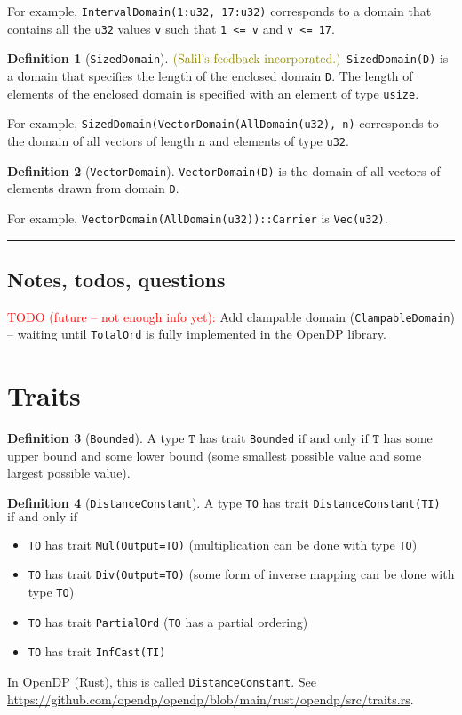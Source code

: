 \documentclass[11pt,a4paper]{article}
\theoremstyle{definition}
\newtheorem{definition}{Definition}[section]
\newcommand{\horizline}{\noindent\rule{\textwidth}{1pt}}
\newcommand{\sfi}{\text{\textcolor{olive}{(Salil's feedback incorporated.)}}}
\newcommand{\inOpenDPRust}[2]{In OpenDP (Rust), this is called \texttt{#1}. See \url{#2}.}
\newcommand{\T}{\texttt{T}}
\newcommand{\todonei}{{\textcolor{red}{TODO (future -- not enough info yet): }}}
\newcommand{\iffText}{\text{if and only if}}
\begin{document}
For example, \texttt{IntervalDomain(1:u32, 17:u32)} corresponds to a domain that contains all the \texttt{u32} values \texttt{v} such that \texttt{1 <= v} and \texttt{v <= 17}.

\begin{definition}[\texttt{SizedDomain}] $\sfi$
    \texttt{SizedDomain(D)} is a domain that specifies the length of the enclosed domain \texttt{D}. The length of elements of the enclosed domain is specified with an element of type \texttt{usize}.
\end{definition}

For example, \texttt{SizedDomain(VectorDomain(AllDomain(u32), n)} corresponds to the domain of all vectors of length $\texttt{n}$ and elements of type \texttt{u32}.

\begin{definition}[\texttt{VectorDomain}]
\texttt{VectorDomain(D)} is the domain of all vectors of elements drawn from domain \texttt{D}.
\end{definition}

For example, \texttt{VectorDomain(AllDomain(u32))::Carrier} is \texttt{Vec(u32)}.

\horizline

\subsection{Notes, todos, questions}
\todonei{Add clampable domain (\texttt{ClampableDomain}) -- waiting until \texttt{TotalOrd} is fully implemented in the OpenDP library.}

\section{Traits}

\begin{definition}[\texttt{Bounded}]
    A type $\T$ has trait \texttt{Bounded} $\iffText$ $\T$ has some upper bound and some lower bound (some smallest possible value and some largest possible value).
\end{definition}

\begin{definition}[\texttt{DistanceConstant}]
    A type \texttt{TO} has trait \texttt{DistanceConstant(TI)} $\iffText$
    \begin{itemize}
        \item \texttt{TO} has trait \texttt{Mul(Output=TO)} (multiplication can be done with type \texttt{TO})
        \item \texttt{TO} has trait \texttt{Div(Output=TO)} (some form of inverse mapping can be done with type \texttt{TO})
        \item \texttt{TO} has trait \texttt{PartialOrd} (\texttt{TO} has a partial ordering)
        \item \texttt{TO} has trait \texttt{InfCast(TI)}
    \end{itemize}
    \inOpenDPRust{DistanceConstant}{https://github.com/opendp/opendp/blob/main/rust/opendp/src/traits.rs}
\end{definition}
\end{document}
